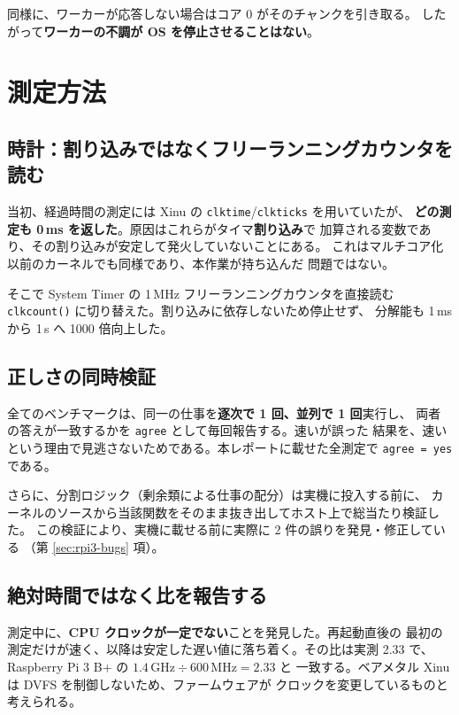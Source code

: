 \documentclass[11pt,a4paper]{article}
\begin{document}
同様に、ワーカーが応答しない場合はコア 0 がそのチャンクを引き取る。
したがって\textbf{ワーカーの不調が OS を停止させることはない}。

\section{測定方法}
\label{sec:method}

\subsection{時計：割り込みではなくフリーランニングカウンタを読む}
\label{sec:clock}

当初、経過時間の測定には Xinu の \texttt{clktime}/\texttt{clkticks} を用いていたが、
\textbf{どの測定も 0\,ms を返した}。原因はこれらがタイマ\textbf{割り込み}で
加算される変数であり、その割り込みが安定して発火していないことにある。
これはマルチコア化以前のカーネルでも同様であり、本作業が持ち込んだ
問題ではない。

そこで System Timer の 1\,MHz フリーランニングカウンタを直接読む
\texttt{clkcount()} に切り替えた。割り込みに依存しないため停止せず、
分解能も 1\,ms から 1\,\textmu s へ 1000 倍向上した。

\subsection{正しさの同時検証}

全てのベンチマークは、同一の仕事を\textbf{逐次で 1 回、並列で 1 回}実行し、
両者の答えが一致するかを \texttt{agree} として毎回報告する。速いが誤った
結果を、速いという理由で見逃さないためである。本レポートに載せた全測定で
\texttt{agree = yes} である。

さらに、分割ロジック（剰余類による仕事の配分）は実機に投入する前に、
カーネルのソースから当該関数をそのまま抜き出してホスト上で総当たり検証した。
この検証により、実機に載せる前に実際に 2 件の誤りを発見・修正している
（第 \ref{sec:rpi3-bugs} 項）。

\subsection{絶対時間ではなく比を報告する}
\label{sec:ratio}

測定中に、\textbf{CPU クロックが一定でない}ことを発見した。再起動直後の
最初の測定だけが速く、以降は安定した遅い値に落ち着く。その比は実測 2.33 で、
Raspberry Pi 3 B+ の $1.4\,\mathrm{GHz} \div 600\,\mathrm{MHz} = 2.33$ と
一致する。ベアメタル Xinu は DVFS を制御しないため、ファームウェアが
クロックを変更しているものと考えられる。
\end{document}
